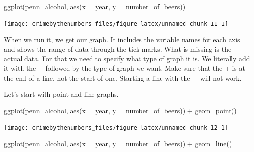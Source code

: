 \documentclass[
]{krantz}
\makeatletter
\newenvironment{Shaded}{\begin{snugshade}}{\end{snugshade}}
\newcommand{\AttributeTok}[1]{\textcolor[rgb]{0.61,0.61,0.61}{#1}}
\newcommand{\FunctionTok}[1]{\textcolor[rgb]{0,0,0}{#1}}
\newcommand{\NormalTok}[1]{#1}
\newcommand{\OtherTok}[1]{\textcolor[rgb]{0.37,0.37,0.37}{#1}}
\newcommand{\SpecialCharTok}[1]{\textcolor[rgb]{0,0,0}{#1}}
\newenvironment{kframe}{%
\medskip{}
\setlength{\fboxsep}{.8em}
 \def\at@end@of@kframe{}%
 \ifinner\ifhmode%
  \def\at@end@of@kframe{\end{minipage}}%
  \begin{minipage}{\columnwidth}%
 \fi\fi%
 \def\FrameCommand##1{\hskip\@totalleftmargin \hskip-\fboxsep
 \colorbox{shadecolor}{##1}\hskip-\fboxsep
     \hskip-\linewidth \hskip-\@totalleftmargin \hskip\columnwidth}%
 \MakeFramed {\advance\hsize-\width
   \@totalleftmargin\z@ \linewidth\hsize
   \@setminipage}}%
 {\par\unskip\endMakeFramed%
 \at@end@of@kframe}
\renewenvironment{Shaded}{\begin{kframe}}{\end{kframe}}
\makeatother
\begin{document}
\begin{Shaded}
\end{Shaded}

\begin{Shaded}
\begin{Highlighting}[]
\FunctionTok{ggplot}\NormalTok{(penn\_alcohol, }\FunctionTok{aes}\NormalTok{(}\AttributeTok{x =}\NormalTok{ year,}
                         \AttributeTok{y =}\NormalTok{ number\_of\_beers))}
\end{Highlighting}
\end{Shaded}

\begin{center}\texttt{[image: crimebythenumbers\_files/figure-latex/unnamed-chunk-11-1]} \end{center}

When we run it, we get our graph. It includes the variable names for each axis and shows the range of data through the tick marks. What is missing is the actual data. For that we need to specify what type of graph it is. We literally add it with the + followed by the type of graph we want. Make sure that the + is at the end of a line, not the start of one. Starting a line with the + will not work.

Let's start with point and line graphs.

\begin{Shaded}
\begin{Highlighting}[]
\FunctionTok{ggplot}\NormalTok{(penn\_alcohol, }\FunctionTok{aes}\NormalTok{(}\AttributeTok{x =}\NormalTok{ year, }\AttributeTok{y =}\NormalTok{ number\_of\_beers)) }\SpecialCharTok{+}
  \FunctionTok{geom\_point}\NormalTok{()}
\end{Highlighting}
\end{Shaded}

\begin{center}\texttt{[image: crimebythenumbers\_files/figure-latex/unnamed-chunk-12-1]} \end{center}

\begin{Shaded}
\begin{Highlighting}[]
\FunctionTok{ggplot}\NormalTok{(penn\_alcohol, }\FunctionTok{aes}\NormalTok{(}\AttributeTok{x =}\NormalTok{ year, }\AttributeTok{y =}\NormalTok{ number\_of\_beers)) }\SpecialCharTok{+}
  \FunctionTok{geom\_line}\NormalTok{()}
\end{Highlighting}
\end{Shaded}
\end{document}
